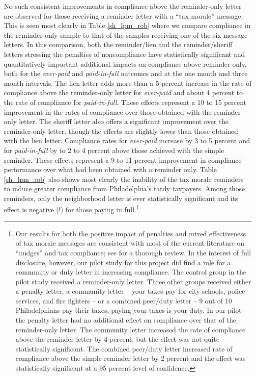 No such consistent improvements in compliance above the reminder-only letter are observed for those
receiving a reminder letter with a ``tax morale'' message.  This is
seen most clearly in Table \ref{sh_lpm_rob} where we compare
compliance in the reminder-only sample to that of the samples
receiving one of the six message letters. In this comparison, both the
reminder/lien and the reminder/sheriff letters stressing the penalties
of noncompliance have statistically significant
and quantitatively important additional impacts on compliance above reminder-only, both
for the \textit{ever-paid} and \textit{paid-in-full} outcomes and at
the one month and three month intervals. The lien letter adds more
than a 5 percent increase in the rate of compliance above the reminder-only
letter for \textit{ever-paid} and about 4 percent to the rate of
compliance for \textit{paid-in-full}. These effects represent a 10 to
15 percent improvement in the rates of compliance over those obtained
with the reminder-only letter.  The sheriff letter also offers a
significant improvement over the reminder-only letter, though the
effects are slightly lower than those obtained with the lien letter.
Compliance rates for \textit{ever-paid} increase by 3 to 5 percent and
for \textit{paid-in-full} by to 2 to 4 percent above those achieved
with the simple reminder.  These effects represent a 9 to 11 percent
improvement in compliance performance over what had been obtained with
a reminder only. Table \ref{sh_lpm_rob} also shows most clearly the
inability of the tax morale reminders to induce greater compliance
from Philadelphia's tardy taxpayers.  Among those reminders, only the
neighborhood letter is ever statistically significant and its effect
is negative (!) for those paying in full.\footnote{\label{fn:nudges}Our results for
  both the positive impact of penalties and mixed effectiveness of tax
  morale messages are consistent with most of the current literature
  on ``nudges'' and tax compliance; see \cite{Hallsworthb-14} for a
  thorough review. In the interest of full disclosure, however, our
  pilot study \cite{CILMS-16} for this project did find a role for a
  community or duty letter in increasing compliance.  The control
  group in the pilot study received a reminder-only letter.  Three
  other groups received either a penalty letter, a community letter --
  your taxes pay for city schools, police services, and fire fighters
  -- or a combined peer/duty letter -- 9 out of 10 Philadelphians pay
  their taxes; paying your taxes is your duty. In our pilot the
  penalty letter had no additional effect on compliance over that of
  the reminder-only letter.  The community letter increased the rate
  of compliance above the reminder letter by 4 percent, but the effect
  was not quite statistically significant.  The combined peer/duty
  letter increased rate of compliance above the simple reminder letter
  by 2 percent and the effect was statistically significant at a 95
  percent level of confidence.}

